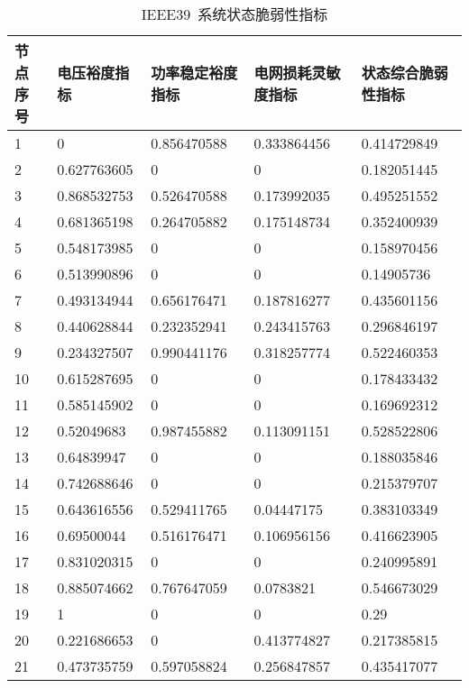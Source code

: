 \begin{table}[H]
  \centering
  \caption{IEEE39~系统状态脆弱性指标}
  \label{tab:chap5:Index2_frabric39}
  \begin{tabular}{C{1.5cm}C{2.5cm}C{2.5cm}C{2.75cm}C{2.75cm}}
  \toprule
  \textbf{节点序号} & \textbf{电压裕度指标} & \textbf{功率稳定裕度指标} & \textbf{电网损耗灵敏度指标} & \textbf{状态综合脆弱性指标} \\
   & 0           & 0.856470588 & 0.333864456 & 0.414729849 \\
  2 & 0.627763605 & 0           & 0           & 0.182051445 \\ 
  3 & 0.868532753 & 0.526470588 & 0.173992035 & 0.495251552 \\ 
  4 & 0.681365198 & 0.264705882 & 0.175148734 & 0.352400939 \\
  5 & 0.548173985 & 0           & 0           & 0.158970456 \\ 
  6 & 0.513990896 & 0           & 0           & 0.14905736 \\ 
  7 & 0.493134944 & 0.656176471 & 0.187816277 & 0.435601156 \\ 
  8 & 0.440628844 & 0.232352941 & 0.243415763 & 0.296846197 \\ 
  9 & 0.234327507 & 0.990441176 & 0.318257774 & 0.522460353 \\ 
  10 & 0.615287695 & 0          & 0           & 0.178433432 \\ 
  11 & 0.585145902 & 0          & 0           & 0.169692312 \\
  12 & 0.52049683  & 0.987455882 & 0.113091151 & 0.528522806 \\ 
  13 & 0.64839947  & 0           & 0           & 0.188035846 \\ 
  14 & 0.742688646 & 0           & 0           & 0.215379707 \\
  15 & 0.643616556 & 0.529411765 & 0.04447175  & 0.383103349 \\ 
  16 & 0.69500044  & 0.516176471 & 0.106956156 & 0.416623905 \\ 
  17 & 0.831020315 & 0           & 0           & 0.240995891 \\ 
  18 & 0.885074662 & 0.767647059 & 0.0783821   & 0.546673029 \\ 
  19 & 1           & 0           & 0           & 0.29 \\ 
  20 & 0.221686653 & 0           & 0.413774827 & 0.217385815 \\ 
  21 & 0.473735759 & 0.597058824 & 0.256847857 & 0.435417077 \\ 

\end{tabular}
\end{table}
